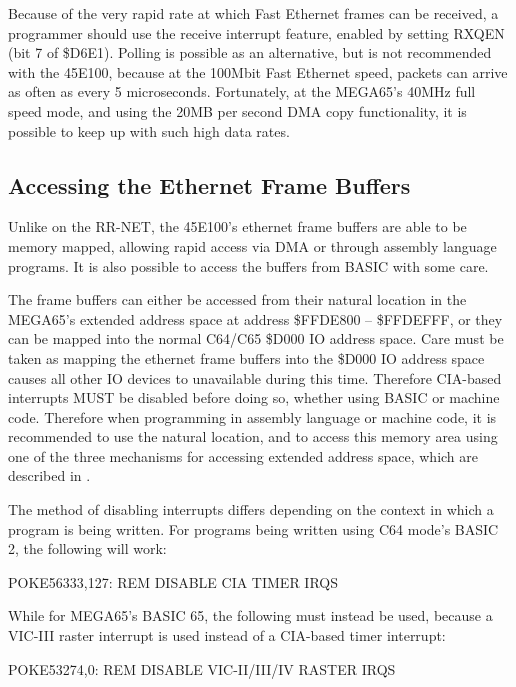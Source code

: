 Because of the very rapid rate at which Fast Ethernet frames can be received, a programmer should use the
receive interrupt feature, enabled by setting RXQEN (bit 7 of \$D6E1).  Polling is possible as an alternative, but
is not recommended with the 45E100, because at the 100Mbit Fast Ethernet speed, packets can arrive
as often as every 5 microseconds.  Fortunately, at the MEGA65's 40MHz full speed mode, and using
the 20MB per second DMA copy functionality, it is possible to keep up with such high data rates.

\subsection{Accessing the Ethernet Frame Buffers}

Unlike on the RR-NET, the 45E100's ethernet frame buffers are able to be memory mapped, allowing rapid access via DMA
or through assembly language programs.  It is also possible to access the buffers from BASIC with some care.

The frame buffers can either be accessed from their natural location in the MEGA65's extended address space at address
\$FFDE800 -- \$FFDEFFF, or they can be mapped into the normal C64/C65 \$D000 IO address space.  Care must be
taken as mapping the ethernet frame buffers into the \$D000 IO address space causes all other IO devices to unavailable
during this time.  Therefore CIA-based interrupts MUST be disabled before doing so, whether using BASIC or machine code.  Therefore
when programming in assembly language or machine code, it is recommended to use the natural location, and to access this
memory area using one of the three mechanisms for accessing extended address space, which are described in .

The method of
disabling interrupts differs depending on the context in which a program is being written. For programs being written using C64 mode's BASIC 2, the following will work:

\begin{screenoutput}
  POKE56333,127: REM DISABLE CIA TIMER IRQS
\end{screenoutput}

While for MEGA65's BASIC 65, the following must instead be used, because a VIC-III raster interrupt is used instead of a CIA-based timer interrupt:

\begin{screenoutput}
POKE53274,0: REM DISABLE VIC-II/III/IV RASTER IRQS
\end{screenoutput}

